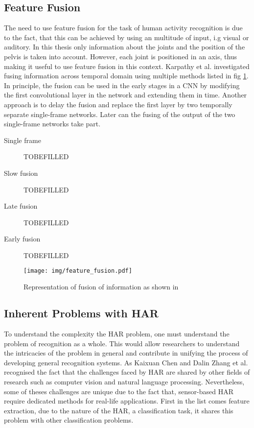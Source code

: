 \subsection{Feature Fusion}\label{subsec:feature-fusion}
The need to use feature fusion for the task of human activity recognition is due to the fact, that this can be achieved by using an multitude of input, i.g visual or auditory. In this thesis only information about the joints and the position of the pelvis is taken into account. However, each joint is positioned in an axis, thus making it useful to use feature fusion in this context. Karpathy et al. investigated fusing information across temporal domain using multiple methods listed in fig \ref{fig:feature_fusion}. In principle, the fusion can be used in the early stages in a CNN by modifying the first convolutional layer in the network and extending them in time. Another approach is to delay the fusion and replace the first layer by two temporally separate single-frame networks. Later can the fusing of the output of the two single-frame networks take part\cite{karpathy2014large}.\newline
\begin{description}
	\item[Single frame] TOBEFILLED
	\item[Slow fusion] TOBEFILLED
	\item[Late fusion] TOBEFILLED
	\item[Early fusion] TOBEFILLED
\end{description}
\begin{figure}
	\centering
	\texttt{[image: img/feature\_fusion.pdf]}
	\caption{Representation of fusion of information as shown in \cite{karpathy2014large}}
	\label{fig:feature_fusion}
\end{figure}
\subsection{Inherent Problems with HAR}\label{subsec:probHAR}
To understand the complexity the HAR problem, one must understand the problem of recognition as a whole. This would allow researchers to understand the intricacies of the problem in general and contribute in unifying the process of developing general recognition systems. As Kaixuan Chen and Dalin Zhang et al. recognised the fact that the challenges faced by HAR are shared by other fields of research such as computer vision and natural language processing\cite{chen2021deep}. Nevertheless, some of theses challenges are unique due to the fact that, sensor-based HAR require dedicated methods for real-life applications.\newline
First in the list comes feature extraction, due to the nature of the HAR, a classification task, it shares this problem with other classification problems. %
